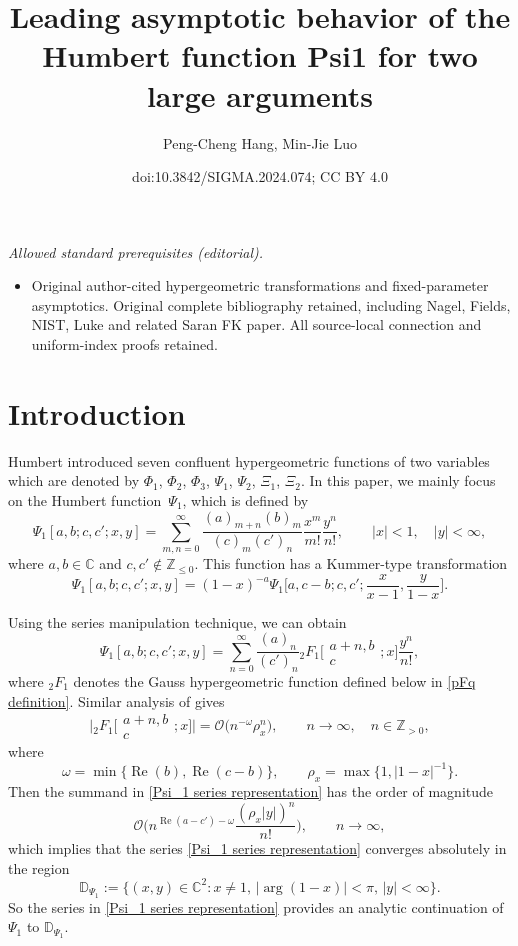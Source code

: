 \documentclass[10pt,a4paper]{amsart}
\title{Leading asymptotic behavior of the Humbert function Psi1 for two large arguments}
\author{Peng-Cheng Hang, Min-Jie Luo}
\date{doi:10.3842/SIGMA.2024.074; CC BY 4.0}
\numberwithin{equation}{section}
\newcommand{\CC}{\ensuremath{\mathbb{C}}}
\newcommand{\ZZ}{\ensuremath{\mathbb{Z}}}
\newcommand{\DD}{\ensuremath{\mathbb{D}}}
\newcommand{\mo}{\mathcal{O}}
\begin{document}
\maketitle
\noindent\textit{Allowed standard prerequisites (editorial).}\begin{itemize}
\item Original author-cited hypergeometric transformations and fixed-parameter asymptotics. Original complete bibliography retained, including Nagel, Fields, NIST, Luke and related Saran FK paper. All source-local connection and uniform-index proofs retained.
\end{itemize}\medskip
\section{Introduction}
Humbert \cite{Humbert-1922} introduced seven confluent hypergeometric functions of two variables which are denoted by $\Phi_1$, $\Phi_2$, $\Phi_3$, $\Psi_1$, $\Psi_2$, $\Xi_1$, $\Xi_2$. In this paper, we mainly focus on the Humbert function~$\Psi_1$, which is defined by
\[\Psi_1[a,b;c,c';x,y]=\sum_{m,n=0}^{\infty}\frac{(a)_{m+n}(b)_m}{(c)_m(c')_n}\frac{x^m}{m!}\frac{y^n}{n!},\qquad |x|<1,\quad |y|<\infty,\]
where $a,b\in\CC$ and $c,c'\notin\ZZ_{\leqslant 0}$. This function has a Kummer-type transformation \cite[equation~(2.54)]{Choi_Hasanov-2011}
\begin{equation}\label{Psi_1 Kummer transformation}
	\Psi_1[a,b;c,c';x,y]=(1-x)^{-a}\Psi_1\biggl[a,c-b;c,c';\frac{x}{x-1},\frac{y}{1-x}\biggr].
\end{equation}

Using the series manipulation technique, we can obtain \cite[equation~(83)]{Brychkov_Saad-2014}
\begin{equation}\label{Psi_1 series representation}
	\Psi_1[a,b;c,c';x,y]=\sum_{n=0}^{\infty}\frac{(a)_n}{(c')_n}{}_2F_1\biggl[\begin{matrix}
		a+n,b \\
		c
	\end{matrix};x\biggr]\frac{y^n}{n!},
\end{equation}
where $_2F_1$ denotes the Gauss hypergeometric function defined below in \eqref{pFq definition}. Similar analysis of \cite[equation~(14)]{Luo_Raina-2021} gives
\[\biggl|{}_2F_1\bigg[\begin{matrix}
	a+n,b \\
	c
\end{matrix};x\bigg]\biggr|=\mo\big(n^{-\omega}\rho_x^n\big),\qquad n\to\infty,\quad n\in\ZZ_{>0},\]
where
\[\omega=\min\{\operatorname{Re}(b),\operatorname{Re}(c-b)\},\qquad \rho_x=\max\bigl\{1,|1-x|^{-1}\bigr\}.\]
Then the summand in \eqref{Psi_1 series representation} has the order of magnitude
\[\mo\bigg(n^{\operatorname{Re}(a-c')-\omega}\frac{(\rho_x|y|)^n}{n!}\bigg),\qquad n\to\infty,\]
which implies that the series \eqref{Psi_1 series representation} converges absolutely in the region
\[\DD_{\Psi_1}:=\bigl\{(x,y)\in\CC^2\colon x\ne 1,\, |{\arg}(1-x)|<\pi,\, |y|<\infty\bigr\}.\]
So the series in \eqref{Psi_1 series representation} provides an analytic continuation of $\Psi_1$ to $\DD_{\Psi_1}$.
\end{document}

